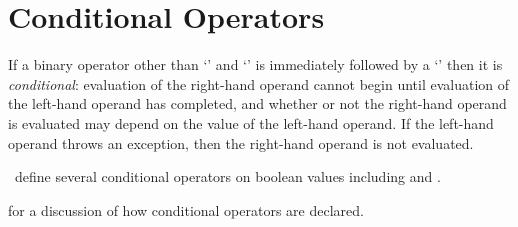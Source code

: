 %
%
%
%

\section{Conditional Operators}

If a binary operator other than `\txt{:}' and `\txt{::}' is immediately followed by a `\txt{:}'
then it is \emph{conditional}: evaluation of the right-hand operand
cannot begin until evaluation of the left-hand operand has completed,
and whether or not the right-hand operand is evaluated may depend on
the value of the left-hand operand.  If the left-hand operand throws
an exception, then the right-hand operand is not evaluated.


\Library\ define several conditional operators
on boolean values including \EXP{\wedge\mathinner{\mathtt{:}}} and
\EXP{\vee\mathinner{\mathtt{:}}}.

 for a discussion of how conditional operators
are declared.

